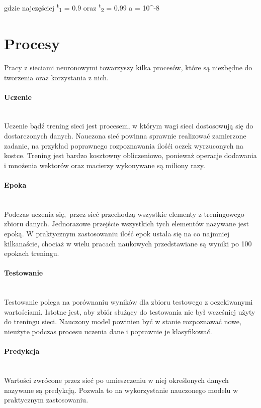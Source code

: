gdzie najczęściej \textbeta \textsuperscript{t}\textsubscript{1} = 0.9 oraz
\textbeta \textsuperscript{t}\textsubscript{2} = 0.99 a \straightepsilon = 10^{-8}\\

\section{Procesy}

Pracy z sieciami neuronowymi towarzyszy kilka procesów, które są niezbędne do tworzenia
oraz korzystania z nich.

\paragraph{Uczenie} \mbox{}\\
Uczenie bądź trening sieci jest procesem, w którym wagi sieci dostosowują się do dostarczonych danych.
Nauczona sieć powinna sprawnie realizować zamierzone zadanie, na przykład poprawnego
rozpoznawania ilośći oczek wyrzuconych na kostce. Trening jest bardzo kosztowny obliczeniowo,
ponieważ operacje dodawania i mnożenia wektorów oraz macierzy wykonywane są miliony razy.

\paragraph{Epoka} \mbox{}\\
Podczas uczenia się, przez sieć przechodzą wszystkie elementy z treningowego zbioru danych.
Jednorazowe przejście wszystkich tych elementów nazywane jest epoką. W praktycznym zastosowaniu
ilość epok ustala się na co najmniej kilkanaście, chociaż w wielu pracach naukowych przedstawiane
są wyniki po 100 epokach treningu.

\paragraph{Testowanie} \mbox{}\\
Testowanie polega na porównaniu wyników dla zbioru testowego z oczekiwanymi wartościami.
Istotne jest, aby zbiór służący do testowania nie był wcześniej użyty do treningu sieci.
Nauczony model powinien być w stanie rozpoznawać nowe, nieużyte podczas procesu uczenia
dane i poprawnie je klasyfikować.

\paragraph{Predykcja} \mbox{}\\
Wartości zwrócone przez sieć po umieszczeniu w niej określonych danych nazywane są
predykcją. Pozwala to na wykorzystanie nauczonego modelu w praktycznym zastosowaniu.

